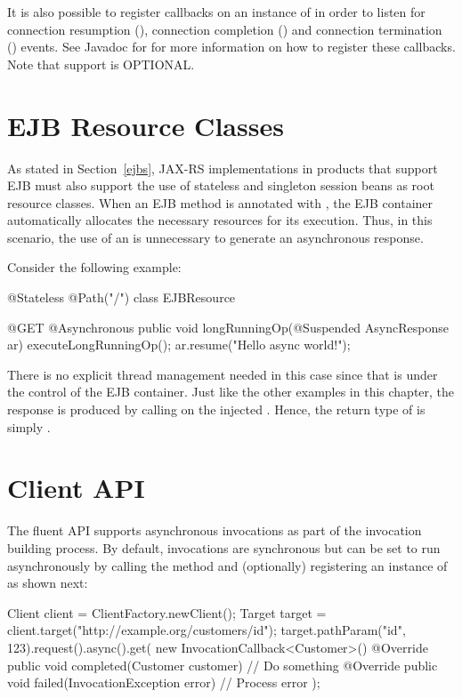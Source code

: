 It is also possible to register callbacks on an instance of  in order to listen for connection resumption (), connection completion () and connection termination () events. See Javadoc for  for more information on how to register these callbacks. Note that support  is OPTIONAL.


\section{EJB Resource Classes}
\label{async_ejbs}

As stated in Section~\ref{ejbs}, JAX-RS implementations in products that
support EJB must also support the use of stateless and singleton session beans
as root resource classes. When an EJB method is annotated with , the 
EJB container automatically allocates the necessary resources for its execution. 
Thus, in this scenario, the use of an  is unnecessary to generate
an asynchronous response.

Consider the following example:

\begin{listing}{1}
@Stateless 
@Path("/")
class EJBResource {

    @GET @Asynchronous
    public void longRunningOp(@Suspended AsyncResponse ar) {
        executeLongRunningOp();
        ar.resume("Hello async world!");
    }
}
\end{listing}

There is no explicit thread management needed in this case since that is
under the control of the EJB container. Just like the other examples in this chapter,
the response is produced by calling  on the injected . Hence, the return type of  is simply .

\section{Client API}
\label{client_api_async}

The fluent API supports asynchronous invocations as part of the invocation building process. By default, invocations are synchronous but can be set to run asynchronously by calling the  method and (optionally) registering an instance of  as shown next:

\begin{listing}{1}
Client client = ClientFactory.newClient();
Target target = client.target("http://example.org/customers/{id}");
target.pathParam("id", 123).request().async().get(
    new InvocationCallback<Customer>() {
        @Override
        public void completed(Customer customer) {
            // Do something
        }
        @Override
        public void failed(InvocationException error) {
            // Process error
        }
    });
\end{listing}

